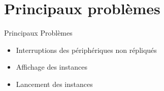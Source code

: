 \documentclass[12pt,francais]{beamer}
\begin{document}
\section*{Principaux problèmes}
\begin{frame}{Principaux Problèmes}
                \begin{center}
                        \begin{itemize}
                                \item Interruptions des périphériques non répliqués
                                \item Affichage des instances
                                \item Lancement des instances
                        \end{itemize}
                \end{center}
\end{frame}
\end{document}
